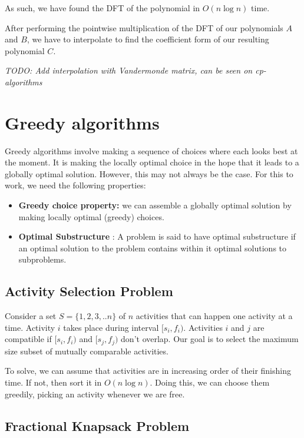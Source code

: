 \documentclass[12pt,letterpaper]{article}
\theoremstyle{definition}
\begin{document}
As such, we have found the DFT of the polynomial in $O(n \log n)$ time.

After performing the pointwise multiplication of the DFT of our polynomials $A$ and $B$, we have to interpolate to find the coefficient form of our resulting polynomial $C$.

\textit{TODO: Add interpolation with Vandermonde matrix, can be seen on cp-algorithms} 

\section{Greedy algorithms}

Greedy algorithms involve making a sequence of choices where each looks best at the moment. It is making the locally optimal choice in the hope that it leads to a globally optimal solution. However, this may not always be the case. For this to work, we need the following properties:

\begin{itemize}
  \item \textbf{Greedy choice property:} we can assemble a globally optimal solution by making locally optimal (greedy) choices.
  \item \textbf{Optimal Substructure} : A problem is said to have optimal substructure if an optimal solution to the problem contains within it optimal solutions to subproblems. 
\end{itemize}

\subsection{Activity Selection Problem}

Consider a set $S = \{1,2,3,..n\}$ of $n$ activities that can happen one activity at a time. Activity $i$ takes place during interval $[s_i,f_i)$. Activities $i$ and $j$ are compatible if $[s_i,f_i)$ and $[s_j,f_j)$ don't overlap. Our goal is to select the maximum size subset of mutually comparable activities. 

To solve, we can assume that activities are in increasing order of their finishing time. If not, then sort it in $O(n \log n)$. Doing this, we can choose them greedily, picking an activity whenever we are free.

\subsection{Fractional Knapsack Problem}
\end{document}
